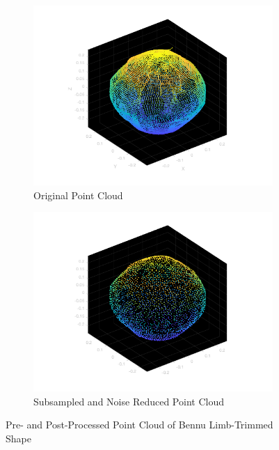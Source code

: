 \begin{figure}[h!]
    \centering
    \begin{subfigure}[t]{0.5\textwidth}
        \centering
        \includegraphics[width = \textwidth]{fig/dense_bennu.png}
        \caption{Original Point Cloud}
    \end{subfigure}%
    \begin{subfigure}[t]{0.5\textwidth}
        \centering
        \includegraphics[width = \textwidth]{fig/sparse_bennu.png}
        \caption{Subsampled and Noise Reduced Point Cloud}
    \end{subfigure}
    \caption{Pre- and Post-Processed Point Cloud of Bennu Limb-Trimmed Shape}
\end{figure} 

